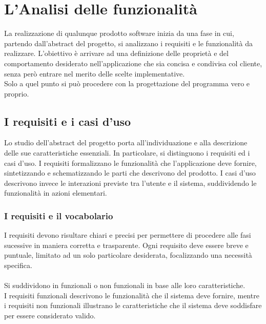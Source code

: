 \section{L'Analisi delle funzionalità}

La realizzazione di qualunque prodotto software inizia da una fase in cui, 
partendo dall’abstract del progetto, si analizzano i requisiti e le funzionalità da realizzare.
L’obiettivo è arrivare ad una definizione delle proprietà e del comportamento desiderato nell’applicazione che sia concisa e condivisa col cliente,
senza però entrare nel merito delle scelte implementative.\\
Solo a quel punto si può procedere con la progettazione del programma vero e proprio.

\subsection{I requisiti e i casi d’uso}

Lo studio dell’abstract del progetto porta all’individuazione e alla descrizione delle sue caratteristiche essenziali.
In particolare, si distinguono i requisiti ed i casi d'uso.
I requisiti formalizzano le funzionalità che l'applicazione deve fornire, 
sintetizzando e schematizzando le parti che descrivono del prodotto.
I casi d'uso descrivono invece le interazioni previste tra l'utente e il sistema, 
suddividendo le funzionalità in azioni elementari.\\

\subsubsection{I requisiti e il vocabolario}
I requisiti devono risultare chiari e precisi per permettere di procedere alle fasi sucessive in maniera corretta e trasparente.
Ogni requisito deve essere breve e puntuale, limitato ad un solo particolare desiderata,
focalizzando una necessità specifica.\\
\\
Si suddividono in funzionali o non funzionali in base alle loro caratteristiche.\\
I requisiti funzionali descrivono le funzionalità che il sistema deve fornire,
mentre i requisiti non funzionali illustrano le caratteristiche che il sistema deve soddisfare per essere considerato valido.\\

